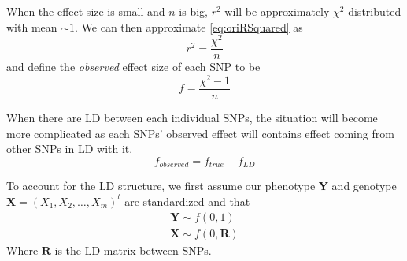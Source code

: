 			When the effect size is small and $n$ is big, $r^2$ will be approximately $\chi^2$ distributed with mean $\sim 1$. 
			We can then approximate \cref{eq:oriRSquared} as
			\begin{equation}
				r^2= \frac{\chi^2}{n}
				\label{eq:approxChi}
			\end{equation}
			and define the \emph{observed} effect size of each \gls{SNP} to be
			\begin{equation}
			f=\frac{\chi^2-1}{n}
			\label{eq:observedEffect}
			\end{equation}
			
			When there are \gls{LD} between each individual \glspl{SNP}, the situation will become more complicated as each \glspl{SNP}' observed effect will contains effect coming from other \glspl{SNP} in \gls{LD} with it. 
			\begin{equation}
			f_{observed} = f_{true}+f_{LD}
			\label{eq:conceptF}
			\end{equation}
			
			To account for the \gls{LD} structure, we first assume our phenotype $\boldsymbol{Y}$ and genotype $\boldsymbol{X}=(X_1,X_2,\dots,X_m)^t$ are standardized and that
			\begin{align*}
				\boldsymbol{Y}\sim f(0,1) \\
				\boldsymbol{X}\sim f(0,\boldsymbol{R})
			\end{align*}
			Where $\boldsymbol{R}$ is the \gls{LD} matrix between \glspl{SNP}.
			
